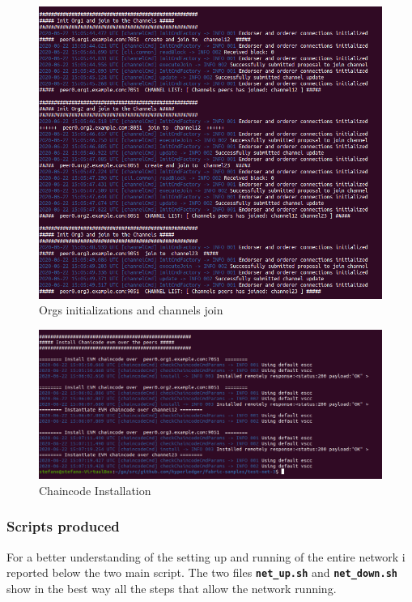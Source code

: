 \begin{figure}[!ht]
    \centering
    \includegraphics[totalheight=8cm]{img/network/net-2.png}
    \caption{Orgs initializations and channels join}
    \label{fig:init-org}
\end{figure}

\begin{figure}[!ht]
    \centering
    \includegraphics[totalheight=6cm]{img/network/net-3.png}
    \caption{Chaincode Installation}
    \label{fig:install-chaincode}
\end{figure}

\subsubsection{Scripts produced}

For a better understanding of the setting up and running of the entire network i reported below
the two main script. The two files \textbf{\texttt{net\_up.sh}} and \textbf{\texttt{net\_down.sh}}
show in the best way all the steps that allow the network running.

